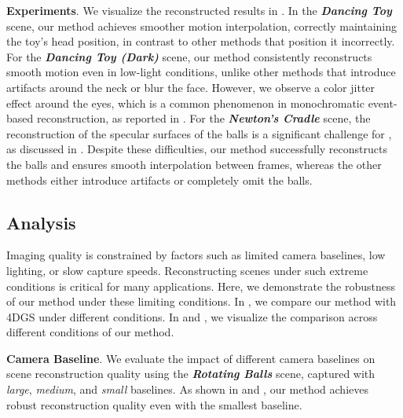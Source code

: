 \noindent
\textbf{Experiments}. We visualize the reconstructed results in \figureautorefname{~\ref{fig:real_world_visualization}}. In the \textit{\textbf{Dancing Toy}} scene, our method achieves smoother motion interpolation, correctly maintaining the toy's head position, in contrast to other methods that position it incorrectly. For the \textit{\textbf{Dancing Toy (Dark)}} scene, our method consistently reconstructs smooth motion even in low-light conditions, unlike other methods that introduce artifacts around the neck or blur the face. However, we observe a color jitter effect around the eyes, which is a common phenomenon in monochromatic event-based reconstruction, as reported in \cite{xiong2024event3dgs,ma2023deformable}. For the \textit{\textbf{Newton's Cradle}} scene, the reconstruction of the specular surfaces of the balls is a significant challenge for \gs, as discussed in \cite{fan2024spectromotion, yang2024spec}. Despite these difficulties, our method successfully reconstructs the balls and ensures smooth interpolation between frames, whereas the other methods either introduce artifacts or completely omit the balls.

\subsection{Analysis}
\label{analysis}

Imaging quality is constrained by factors such as limited camera baselines, low lighting, or slow capture speeds. Reconstructing scenes under such extreme conditions is critical for many applications. Here, we demonstrate the robustness of our method under these limiting conditions. In \tableautorefname{~\ref{tab:conditions}}, we compare our method with 4DGS \cite{yang2023gs4d} under different conditions. In \figureautorefname{~\ref{fig:baseline_numframes}} and \figureautorefname{~\ref{fig:object_speed_lighting}}, we visualize the comparison across different conditions of our method.




\noindent
\textbf{Camera Baseline}. 
We evaluate the impact of different camera baselines on scene reconstruction quality using the \textit{\textbf{Rotating Balls}} scene, captured with \textit{large}, \textit{medium}, and \textit{small} baselines.
As shown in \tableautorefname{~\ref{tab:conditions}} and \figureautorefname{~\ref{fig:object_speed}}, our method achieves robust reconstruction quality even with the smallest baseline.




